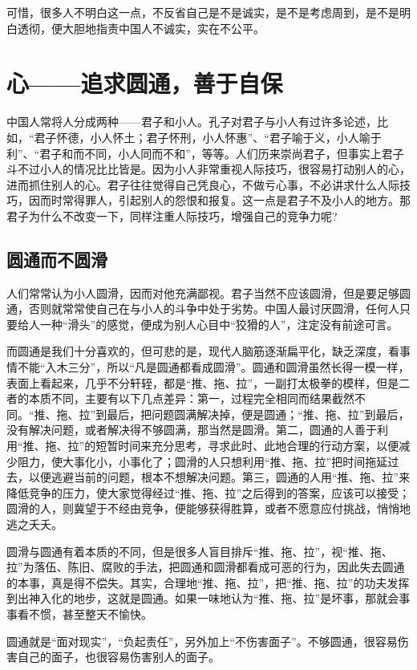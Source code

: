 \documentclass[fontset=fandol, a4paper, 12pt, openright]{ctexbook}
\begin{document}
可惜，很多人不明白这一点，不反省自己是不是诚实，是不是考虑周到，是不是明白透彻，便大胆地指责中国人不诚实，实在不公平。


\chapter{心——追求圆通，善于自保}
中国人常将人分成两种——君子和小人。孔子对君子与小人有过许多论述，比如，“君子怀德，小人怀土；君子怀刑，小人怀惠”、“君子喻于义，小人喻于利”、“君子和而不同，小人同而不和”，等等。人们历来崇尚君子，但事实上君子斗不过小人的情况比比皆是。因为小人非常重视人际技巧，很容易打动别人的心，进而抓住别人的心。君子往往觉得自己凭良心，不做亏心事，不必讲求什么人际技巧，因而时常得罪人，引起别人的怨恨和报复。这一点是君子不及小人的地方。那君子为什么不改变一下，同样注重人际技巧，增强自己的竞争力呢?

\section{圆通而不圆滑}

人们常常认为小人圆滑，因而对他充满鄙视。君子当然不应该圆滑，但是要足够圆通，否则就常常使自己在与小人的斗争中处于劣势。中国人最讨厌圆滑，任何人只要给人一种“滑头”的感觉，便成为别人心目中“狡猾的人”，注定没有前途可言。

而圆通是我们十分喜欢的，但可悲的是，现代人脑筋逐渐扁平化，缺乏深度，看事情不能“入木三分”，所以“凡是圆通都看成圆滑”。圆通和圆滑虽然长得一模一样，表面上看起来，几乎不分轩轾，都是“推、拖、拉”，一副打太极拳的模样，但是二者的本质不同，主要有以下几点差异：第一，过程完全相同而结果截然不同。“推、拖、拉”到最后，把问题圆满解决掉，便是圆通；“推、拖、拉”到最后，没有解决问题，或者解决得不够圆满，那当然是圆滑。第二，圆通的人善于利用“推、拖、拉”的短暂时间来充分思考，寻求此时、此地合理的行动方案，以便减少阻力，使大事化小，小事化了；圆滑的人只想利用“推、拖、拉”把时间拖延过去，以便逃避当前的问题，根本不想解决问题。第三，圆通的人用“推、拖、拉”来降低竞争的压力，使大家觉得经过“推、拖、拉”之后得到的答案，应该可以接受；圆滑的人，则冀望于不经由竞争，便能够获得胜算，或者不愿意应付挑战，悄悄地逃之夭夭。

圆滑与圆通有着本质的不同，但是很多人盲目排斥“推、拖、拉”，视“推、拖、拉”为落伍、陈旧、腐败的手法，把圆通和圆滑都看成可恶的行为，因此失去圆通的本事，真是得不偿失。其实，合理地“推、拖、拉”，把“推、拖、拉”的功夫发挥到出神入化的地步，这就是圆通。如果一味地认为“推、拖、拉”是坏事，那就会事事看不惯，甚至整天不愉快。

圆通就是“面对现实”，“负起责任”，另外加上“不伤害面子”。不够圆通，很容易伤害自己的面子，也很容易伤害别人的面子。
\end{document}
